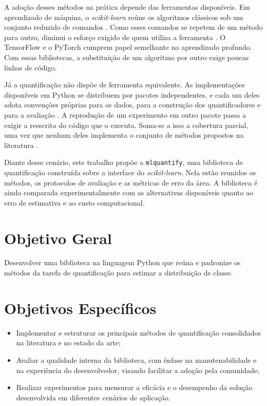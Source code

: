 A adoção desses métodos na prática depende das ferramentas disponíveis. Em aprendizado de
máquina, o \textit{scikit-learn} reúne os algoritmos clássicos sob um conjunto reduzido
de comandos \cite{pedregosa2011}. Como esses comandos se repetem de um método para outro,
diminui o esforço exigido de quem utiliza a ferramenta \cite{buitinck2013api}. O
TensorFlow \cite{abadi2016} e o PyTorch \cite{paszke2019} cumprem papel semelhante no
aprendizado profundo. Com essas bibliotecas, a substituição de um algoritmo por outro
exige poucas linhas de código.

Já a quantificação não dispõe de ferramenta equivalente. As implementações disponíveis em
Python se distribuem por pacotes independentes, e cada um deles adota convenções próprias
para os dados, para a construção dos quantificadores e para a avaliação
\cite{moreo2021quapy, castano2024quantificationlib, bunse2024qunfold}. A reprodução de um
experimento em outro pacote passa a exigir a reescrita do código que o executa. Soma-se a
isso a cobertura parcial, uma vez que nenhum deles implementa o conjunto de métodos
propostos na literatura \cite{schumacher2021comparative}.

Diante desse cenário, este trabalho propõe a \texttt{mlquantify}, uma biblioteca de
quantificação construída sobre a interface do \textit{scikit-learn}. Nela estão reunidos
os métodos, os protocolos de avaliação e as métricas de erro da área. A biblioteca é
ainda comparada experimentalmente com as alternativas disponíveis quanto ao erro de
estimativa e ao custo computacional.

\section*{Objetivo Geral}

Desenvolver uma biblioteca na linguagem Python que reúna e padronize os métodos da tarefa
de quantificação para estimar a distribuição de classe.

\section*{Objetivos Específicos}

\begin{itemize}
    \item Implementar e estruturar os principais métodos de quantificação consolidados na
    literatura e no estado da arte;
    \item Avaliar a qualidade interna da biblioteca, com ênfase na manutenabilidade e na
    experiência do desenvolvedor, visando facilitar a adoção pela comunidade;
    \item Realizar experimentos para mensurar a eficácia e o desempenho da solução
    desenvolvida em diferentes cenários de aplicação.
\end{itemize}

